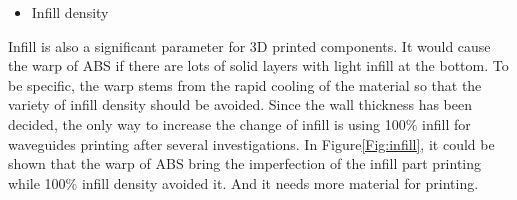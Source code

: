 \begin{itemize}
\item Infill density
\end{itemize}
Infill is also a significant parameter for 3D printed components. It would cause the warp of ABS if there are lots of solid layers with light infill at the bottom. To be specific, the warp stems from the rapid cooling of the material so that the variety of infill density should be avoided. Since the wall thickness has been decided, the only way to increase the change of infill is using 100$\%$ infill for waveguides printing after several investigations. In Figure\ref{Fig:infill}, it could be shown that the warp of ABS bring the imperfection of the infill part printing while 100$\%$ infill density avoided it. And it needs more material for printing.
\begin{figure}[htbp] %
	\centering
\end{figure}
